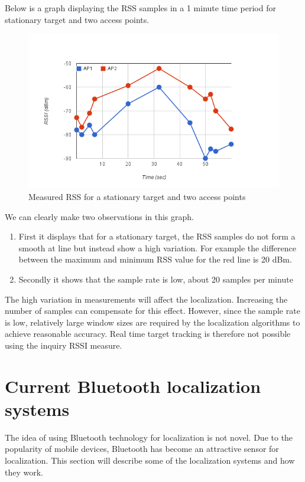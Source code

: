 \documentclass[12pt]{article}
\begin{document}
Below is a graph displaying the RSS samples in a 1 minute time period for stationary target and two access points. \\

\begin{figure}[h!]
\centering
\includegraphics[width=\linewidth]{graph}
\caption{Measured RSS for a stationary target and two access points}
\end{figure} 

We can clearly make two observations in this graph.
\begin{enumerate}
  \item First it displays that for a stationary target, the RSS samples do not form a smooth 
at line but instead show a high variation. For example the difference between the maximum and minimum RSS value for the red line is 20 dBm.
  \item Secondly it shows that the sample rate is low, about 20 samples per minute
\end{enumerate}

The high variation in measurements will affect the localization. Increasing the number of samples can compensate for this effect. However, since the sample rate is low,
relatively large window sizes are required by the localization algorithms to achieve reasonable
accuracy. Real time target tracking is therefore not possible using the inquiry RSSI measure. 


\section{Current Bluetooth localization systems}
The idea of using Bluetooth technology for localization is not novel. Due to the popularity of mobile devices, Bluetooth has become an attractive sensor for localization. This section will describe some of the localization systems and how they work. \\ 
\end{document}
